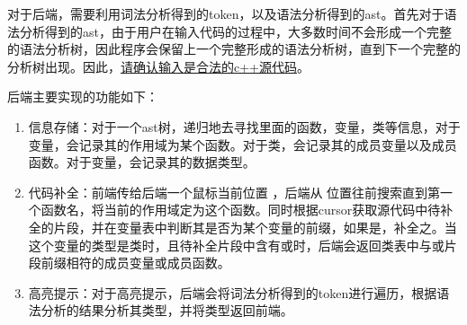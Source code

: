 对于后端，需要利用词法分析得到的token，以及语法分析得到的ast。首先对于语法分析得到的ast，由于用户在输入代码的过程中，大多数时间不会形成一个完整的语法分析树，因此程序会保留上一个完整形成的语法分析树，直到下一个完整的分析树出现。因此，\underline{请确认输入是合法的c++源代码}。

后端主要实现的功能如下：
\begin{enumerate}
    \item 信息存储：对于一个ast树，递归地去寻找里面的函数，变量，类等信息，对于变量，会记录其的作用域为某个函数。对于类，会记录其的成员变量以及成员函数。对于变量，会记录其的数据类型。
    \item 代码补全：前端传给后端一个鼠标当前位置  ，后端从  位置往前搜索直到第一个函数名，将当前的作用域定为这个函数。同时根据cursor获取源代码中待补全的片段，并在变量表中判断其是否为某个变量的前缀，如果是，补全之。当这个变量的类型是类时，且待补全片段中含有或\code{->}时，后端会返回类表中与或\code{->}片段前缀相符的成员变量或成员函数。
    \item 高亮提示：对于高亮提示，后端会将词法分析得到的token进行遍历，根据语法分析的结果分析其类型，并将类型返回前端。
\end{enumerate}


